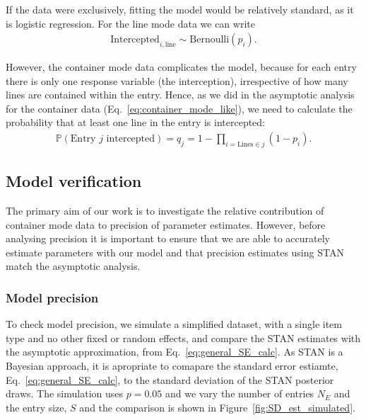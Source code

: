 \documentclass{article}
\begin{document}
If the data were exclusively, fitting the model would be relatively standard, as it is logistic regression. For the line mode data we can write
\begin{align}
\text{Intercepted}_{i,\text{line}} \sim \text{Bernoulli}(p_i).
\end{align}


However, the container mode data complicates the model, because for each entry there is only one response variable (the interception), irrespective of how many lines are contained within the entry. Hence, as we did in the asymptotic analysis for the container data (Eq.~\eqref{eq:container_mode_like}), we need to calculate the probability that at least one line in the entry is intercepted:
\begin{align}
\mathbb P(\text{Entry } j \text{ intercepted}) = q_j = 1 - \prod_{i=\text{Lines}\in j} (1-p_i).
\end{align}


\subsection{Model verification}
The primary aim of our work is to investigate the relative contribution of container mode data to precision of parameter estimates. However, before analysing precision it is important to ensure that we are able to accurately estimate parameters with our model and that precision estimates using STAN match the asymptotic analysis.
\subsubsection{Model precision}
To check model precision, we simulate a simplified dataset, with a single item type and no other fixed or random effects, and compare the STAN estimates with the asymptotic approximation, from Eq.~\eqref{eq:general_SE_calc}. As STAN is a Bayesian approach, it is apropriate to comapare the standard error estiamte, Eq.~\eqref{eq:general_SE_calc}, to the standard deviation of the STAN posterior draws. 
The simulation uses \(p=0.05\) and we vary the number of entries \(N_E\) and the entry size, \(S\) and the comparison is shown in Figure~\ref{fig:SD_est_simulated}.
\end{document}
